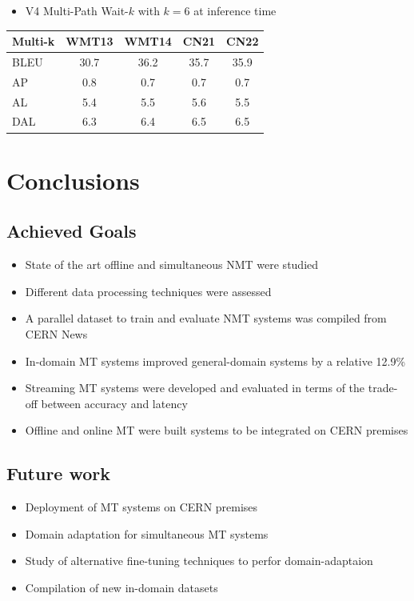 \documentclass[landscape]{article}
\begin{document}
\begin{itemize}
	\item V4 Multi-Path Wait-$k$ with $k = 6$ at inference time
\end{itemize}
\begin{table}[ht]
\centering
\begin{tabular}{l|c|c|c|c}
    Multi-k & WMT13 & WMT14 & CN21 & CN22 \\
\hline
    BLEU & 30.7 & 36.2 & 35.7 & 35.9 \\
    \hline
    AP & 0.8 & 0.7 & 0.7 & 0.7 \\
    AL & 5.4 & 5.5 & 5.6 & 5.5 \\
    DAL & 6.3 & 6.4 & 6.5 & 6.5 \\
\end{tabular}
\label{table:testres}
\end{table}


\cp
\section{Conclusions}
\vspace*{5mm}
\subsection*{Achieved Goals}
\begin{itemize}\itemsep=5mm
	\item State of the art offline and simultaneous NMT were studied
    \item Different data processing techniques were assessed 
    \item A parallel dataset to train and evaluate NMT systems was compiled from CERN News 
	\item In-domain MT systems improved general-domain systems by a relative 12.9\%
    \item Streaming MT systems were developed and evaluated in terms of the trade-off between accuracy and latency
    \item Offline and online MT were built systems to be integrated on CERN premises
\end{itemize}

\subsection*{Future work}
\begin{itemize}\itemsep=5mm
	\item Deployment of MT systems on CERN premises
	\item Domain adaptation for simultaneous MT systems
	\item Study of alternative fine-tuning techniques to perfor domain-adaptaion 
    \item Compilation of new in-domain datasets 
\end{itemize}
\end{document}

